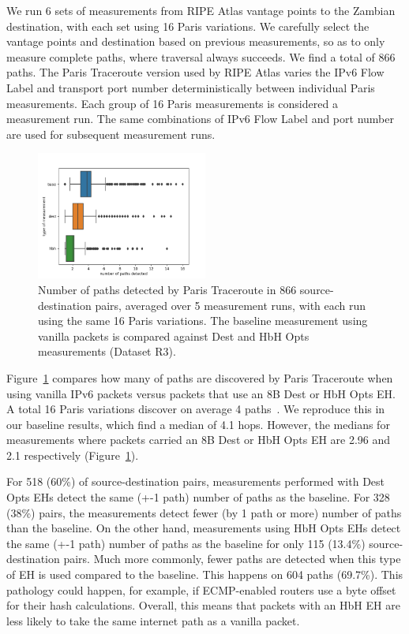 \documentclass[conference]{IEEEtran}
\begin{document}
We run 6 sets of measurements from RIPE Atlas vantage points to the Zambian destination, with each set using 16 Paris variations. We carefully select the vantage points and destination based on previous measurements, so as to only measure complete paths, where traversal always succeeds. We find a total of 866 paths. The Paris Traceroute version used by RIPE Atlas varies the IPv6 Flow Label and transport port number deterministically between individual Paris measurements. Each group of 16 Paris measurements is considered a measurement run. The same combinations of IPv6 Flow Label and port number are used for subsequent measurement runs.

\begin{figure}
\centering
  \includegraphics[width=0.5\textwidth]{boxplot-paths-detected.png}
  \caption{Number of paths detected by Paris Traceroute in 866 source-destination pairs, averaged over 5 measurement runs, with each run using the same 16 Paris variations. The baseline measurement using vanilla packets is compared against Dest and HbH Opts measurements (Dataset R3).}
  \label{fig:paths-detected}
\end{figure}

Figure~\ref{fig:paths-detected} compares how many of paths are discovered by Paris Traceroute when using vanilla IPv6 packets versus packets that use an 8B Dest or HbH Opts EH.
A total 16 Paris variations discover on average 4 paths~\cite{augustin2006avoiding}. We reproduce this in our baseline results, which find a median of 4.1 hops. However, the medians for measurements where packets carried an 8B Dest or HbH Opts EH are 2.96 and 2.1 respectively (Figure~\ref{fig:paths-detected}).

For 518 (60\%) of source-destination pairs, measurements performed with Dest Opts EHs detect the same (+-1 path) number of paths as the baseline. For 328 (38\%) pairs, the measurements detect fewer (by 1 path or more) number of paths than the baseline. On the other hand, measurements using HbH Opts EHs detect the same (+-1 path) number of paths as the baseline for only 115 (13.4\%) source-destination pairs. Much more commonly, fewer paths are detected when this type of EH is used compared to the baseline. This happens on 604 paths (69.7\%). This pathology could happen, for example, if ECMP-enabled routers use a byte offset for their hash calculations. Overall, this means that packets with an HbH EH are less likely to take the same internet path as a vanilla packet.
\end{document}
